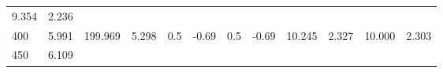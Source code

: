 \documentclass{article}
\begin{document}
\begin{longtable}[]{@{}llllllllllll@{}}
\begin{minipage}[t]{0.06\columnwidth}
9.354\strut
\end{minipage} & \begin{minipage}[t]{0.09\columnwidth}\raggedright\strut
2.236\strut
\end{minipage}\tabularnewline
\begin{minipage}[t]{0.03\columnwidth}\raggedright\strut
400\strut
\end{minipage} & \begin{minipage}[t]{0.06\columnwidth}\raggedright\strut
5.991\strut
\end{minipage} & \begin{minipage}[t]{0.06\columnwidth}\raggedright\strut
199.969\strut
\end{minipage} & \begin{minipage}[t]{0.08\columnwidth}\raggedright\strut
5.298\strut
\end{minipage} & \begin{minipage}[t]{0.03\columnwidth}\raggedright\strut
0.5\strut
\end{minipage} & \begin{minipage}[t]{0.06\columnwidth}\raggedright\strut
-0.69\strut
\end{minipage} & \begin{minipage}[t]{0.03\columnwidth}\raggedright\strut
0.5\strut
\end{minipage} & \begin{minipage}[t]{0.06\columnwidth}\raggedright\strut
-0.69\strut
\end{minipage} & \begin{minipage}[t]{0.06\columnwidth}\raggedright\strut
10.245\strut
\end{minipage} & \begin{minipage}[t]{0.08\columnwidth}\raggedright\strut
2.327\strut
\end{minipage} & \begin{minipage}[t]{0.06\columnwidth}\raggedright\strut
10.000\strut
\end{minipage} & \begin{minipage}[t]{0.09\columnwidth}\raggedright\strut
2.303\strut
\end{minipage}\tabularnewline
\begin{minipage}[t]{0.03\columnwidth}\raggedright\strut
450\strut
\end{minipage} & \begin{minipage}[t]{0.06\columnwidth}\raggedright\strut
6.109\strut
\end{minipage} & \begin{minipage}[t]{0.06\columnwidth}\raggedright\strut

\end{minipage}
\end{longtable}
\end{document}
